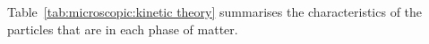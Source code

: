 \pagebreak
      \label{m38730*id308767}Table~\ref{tab:microscopic:kinetic theory} summarises the characteristics of the particles that are in each phase of matter.
